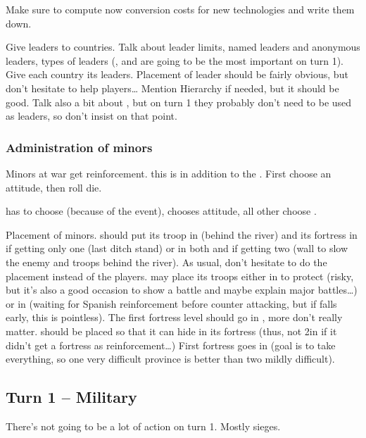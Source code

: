 \aparag Make sure to compute now conversion costs for new technologies and
write them down.

\aparag Give leaders to countries.
\bparag Talk about leader limits, named leaders and anonymous leaders, types
of leaders (\LeaderG, \LeaderE and \LeaderC are going to be the most important
on turn 1).
\bparag Give each country its leaders.
\bparag Placement of leader should be fairly obvious, but don't hesitate to
help players\ldots
\bparag Mention Hierarchy if needed, but it should be good. Talk also a bit
about \Pashas, but on turn 1 they probably don't need to be used as leaders,
so don't insist on that point.

\subsubsection{Administration of minors}
\aparag Minors at war get reinforcement.
\bparag this is in addition to the .
\bparag First choose an attitude, then roll die.

\aparag \paysEcosse has to choose  (because of the event),
\paysSavoie chooses  attitude, all other choose
.

\aparag Placement of minors.
\bparag \paysCosaquesdon should put its troop in \provinceDon (behind the
river) and its fortress in \provinceDon if getting only one (last ditch stand)
or in both  and \provinceDonets if getting two (wall to
slow the enemy and troops behind the river). As usual, don't hesitate to do
the placement instead of the players.
\bparag \paysNaples may place its troops either in \provinceCampania to
protect \villeNaples (risky, but it's also a good occasion to show a battle
and maybe explain major battles\ldots) or in \provinceBasilicata (waiting for
Spanish reinforcement before counter attacking, but if \villeNaples falls
early, this is pointless). The first fortress level should go in \villeNaples,
more don't really matter.
\bparag \paysGeorgie should be placed so that it can hide in its fortress
(thus, not 2\LD in \provinceGeorgie if it didn't get a fortress as
reinforcement\ldots) First fortress goes in \provinceGeorgie (\TUR goal is to
take everything, so one very difficult province is better than two mildly
difficult).

\subsection{Turn 1 -- Military}
\aparag There's not going to be a lot of action on turn 1. Mostly sieges.

